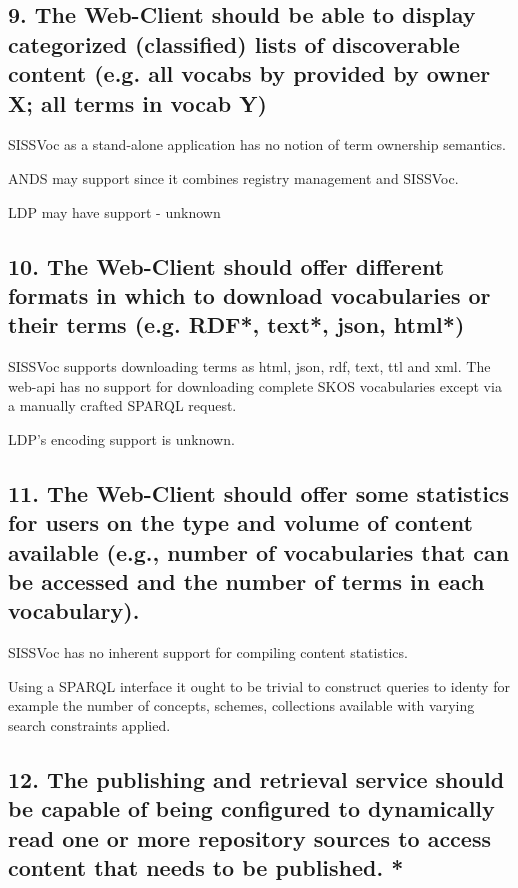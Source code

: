 \documentclass[10pt,a4paper]{article}
\begin{document}
\begin{flushleft}

\subsection{ 9. The Web-Client should be able to display categorized
(classified) lists of discoverable content (e.g. all vocabs by provided by
owner X; all terms in vocab Y) }


\item[SISSVoc] as a stand-alone application has no notion of term ownership semantics.  

\item [ANDS] may support since it combines registry management and SISSVoc. 

\item [LDP] may have support - unknown



\subsection{ 10. The Web-Client should offer different formats in which to
download vocabularies or their terms (e.g. RDF*, text*, json, html*) }

SISSVoc supports downloading terms as html, json, rdf, text, ttl and xml. The
web-api has no support for downloading complete SKOS vocabularies except via a
manually crafted SPARQL request.

LDP's encoding support is unknown.

\subsection{ 11. The Web-Client should offer some statistics for users on the
type and volume of content available (e.g., number of vocabularies that can be
accessed and the number of terms in each vocabulary).  }
 

SISSVoc has no inherent support for compiling content statistics.

Using a SPARQL interface it ought to be trivial to construct queries to identy
for example the number of concepts, schemes, collections available with varying
search constraints applied. 

\subsection{ 12. The publishing and retrieval service should be capable of
being configured to dynamically read one or more repository sources to access
content that needs to be published. * }


\end{flushleft}
\end{document}
